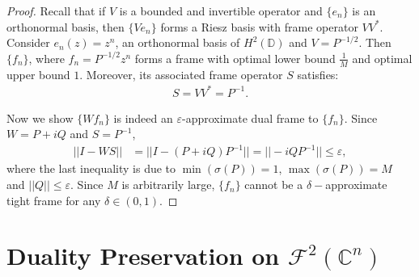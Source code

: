 \documentclass{amsart}
\theoremstyle{definition}
\theoremstyle{remark}
\numberwithin{equation}{section}
\newcommand{\D}{\mathbb{D}} %
\begin{document}
\begin{proof}
 Recall that if $V$ is a bounded and invertible operator and $\{ e_n \}$ is an orthonormal basis, then $\{ Ve_n \}$ forms a Riesz basis with frame operator  $VV^*$. Consider $e_n(z) = z^n$, an orthonormal basis of $H^2(\D)$ and $V= P^{-1/2}$. Then $\{f_n \}$, where $f_n = P^{-1/2}z^n$ forms a frame with optimal lower bound $\tfrac{1}{M}$ and optimal upper bound $1$. Moreover, its associated frame operator $S$ satisfies:
 \begin{align*}
     S=VV^{*}=P^{-1}.
 \end{align*}
 
Now we show $\{Wf_n\}$ is indeed an $\varepsilon$-approximate dual frame to $\{f_n\}$. Since $W = P+ iQ$ and $S= P^{-1}$,
\begin{align*}
    ||I -WS || &= || I - (P+iQ)P^{-1}||
    = ||-i QP^{-1}|| \leq \varepsilon,
\end{align*}
where the last inequality is due to $\min(\sigma (P))=1$, $\max(\sigma (P))=M$ and  $||Q|| \leq \varepsilon$. Since $M$ is arbitrarily large, $\{f_n\}$ cannot be a $\delta-$approximate tight frame for any $\delta \in (0,1)$. 
\end{proof}


\section{Duality Preservation on \texorpdfstring{$\mathcal{F}^{2}(\mathbb{C}^{n})$}{Fock space}}\label{sec:dualpreservation_Fock}
\end{document}
